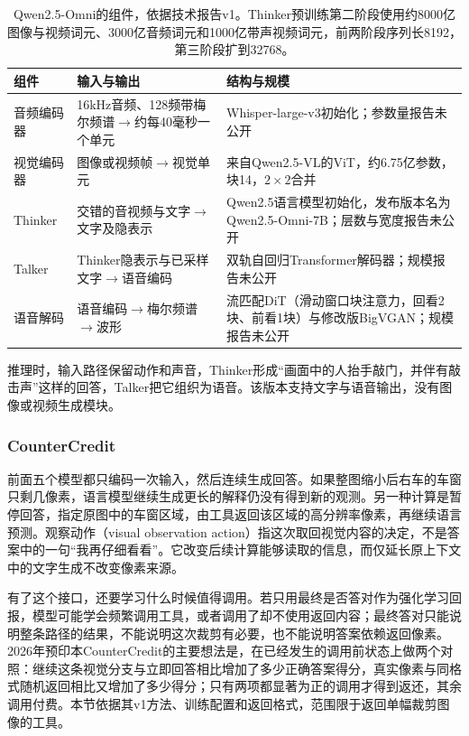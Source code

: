 \begin{table}[htbp]
  \centering
  \small
  \begin{tabularx}{\linewidth}{@{}p{14mm}XX@{}}
    \toprule
    组件 & 输入与输出 & 结构与规模\\
    \midrule
    音频编码器 & 16kHz音频、128频带梅尔频谱$\to$约每40毫秒一个单元 & Whisper-large-v3初始化；参数量报告未公开\\
    视觉编码器 & 图像或视频帧$\to$视觉单元 & 来自Qwen2.5-VL的ViT，约6.75亿参数，块14，$2\times2$合并\\
    Thinker & 交错的音视频与文字$\to$文字及隐表示 & Qwen2.5语言模型初始化，发布版本名为Qwen2.5-Omni-7B；层数与宽度报告未公开\\
    Talker & Thinker隐表示与已采样文字$\to$语音编码 & 双轨自回归Transformer解码器；规模报告未公开\\
    语音解码 & 语音编码$\to$梅尔频谱$\to$波形 & 流匹配DiT（滑动窗口块注意力，回看2块、前看1块）与修改版BigVGAN；规模报告未公开\\
    \bottomrule
  \end{tabularx}
  \caption{Qwen2.5-Omni的组件，依据技术报告v1。Thinker预训练第二阶段使用约8000亿图像与视频词元、3000亿音频词元和1000亿带声视频词元，前两阶段序列长8192，第三阶段扩到32768。}
  \label{tab:vision-models-omni-config}
\end{table}推理时，输入路径保留动作和声音，Thinker形成“画面中的人抬手敲门，并伴有敲击声”这样的回答，Talker把它组织为语音。该版本支持文字与语音输出，没有图像或视频生成模块。

\subsubsection{CounterCredit}
\label{sec:vision-models-observation}
\label{sec:vision-models-countercredit}

前面五个模型都只编码一次输入，然后连续生成回答。如果整图缩小后右车的车窗只剩几像素，语言模型继续生成更长的解释仍没有得到新的观测。另一种计算是暂停回答，指定原图中的车窗区域，由工具返回该区域的高分辨率像素，再继续语言预测。观察动作（visual observation action）指这次取回视觉内容的决定，不是答案中的一句“我再仔细看看”。它改变后续计算能够读取的信息，而仅延长原上下文中的文字生成不改变像素来源。

有了这个接口，还要学习什么时候值得调用。若只用最终是否答对作为强化学习回报，模型可能学会频繁调用工具，或者调用了却不使用返回内容；最终答对只能说明整条路径的结果，不能说明这次裁剪有必要，也不能说明答案依赖返回像素。2026年预印本CounterCredit的主要想法是，在已经发生的调用前状态上做两个对照：继续这条视觉分支与立即回答相比增加了多少正确答案得分，真实像素与同格式随机返回相比又增加了多少得分；只有两项都显著为正的调用才得到返还，其余调用付费。本节依据其v1方法、训练配置和返回格式，范围限于返回单幅裁剪图像的工具。

